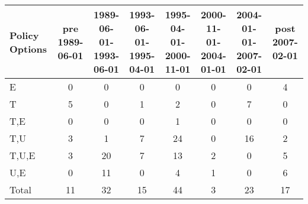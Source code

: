 \begin{tabular}{lccccccc}
\hline\hline 
\addlinespace 
Policy Options & pre 1989-06-01 & \shortstack{1989-06-01- \\ 1993-06-01} & \shortstack{1993-06-01- \\ 1995-04-01} & \shortstack{1995-04-01- \\ 2000-11-01} & \shortstack{2000-11-01- \\ 2004-01-01} & \shortstack{2004-01-01- \\ 2007-02-01} & post 2007-02-01 \\ 
\hline 
E & 0 & 0 & 0 & 0 & 0 & 0 & 4 \\
T & 5 & 0 & 1 & 2 & 0 & 7 & 0 \\
T,E & 0 & 0 & 0 & 1 & 0 & 0 & 0 \\
T,U & 3 & 1 & 7 & 24 & 0 & 16 & 2 \\
T,U,E & 3 & 20 & 7 & 13 & 2 & 0 & 5 \\
U,E & 0 & 11 & 0 & 4 & 1 & 0 & 6 \\
\addlinespace 
Total & 11 & 32 & 15 & 44 & 3 & 23 & 17 \\
\hline 
\end{tabular}